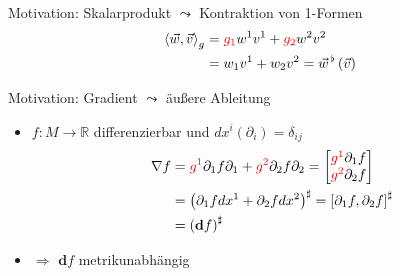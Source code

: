 \documentclass{beamer}
\newcommand{\R}{\mathds{R}}
\newcommand{\exd}{\mathbf{d}}
\newcommand{\vecflat}[1]{\vec{#1}^{\,\flat}}
\newcommand{\tred}[1]{\textcolor{red}{#1}}
\begin{document}
  \begin{frame}
    \begin{block}{Motivation: Skalarprodukt \( \leadsto \) Kontraktion von 1-Formen}
      \begin{align*}
        \left\langle \vec{w} , \vec{v} \right\rangle_{g} &= \tred{g_{1}}w^{1}v^{1} + \tred{g_{2}}w^{2}v^{2} \\
                                                     &= w_{1}v^{1} + w_{2}v^{2} 
                                                     = \vecflat{w}\left( \vec{v} \right)
      \end{align*}
    \end{block}

    \begin{block}{Motivation: Gradient \( \leadsto \) äußere Ableitung}
    \begin{itemize}
        \item \( f:M \rightarrow \R \) differenzierbar und \( dx^{i}(\partial_{i}) = \delta_{ij}  \)
      \begin{align*}
        \nabla f &= \tred{g^{1}}\partial_{1}f\partial_{1} + \tred{g^{2}}\partial_{2}f\partial_{2} =\begin{bmatrix}
                                                                                         \tred{g^{1}}\partial_{1}f \\
                                                                                         \tred{g^{2}}\partial_{2}f
                                                                                      \end{bmatrix} \\
                 &= \left( \partial_{1}f dx^{1} + \partial_{2}f dx^{2} \right)^{\sharp} = \left[ \partial_{1}f, \partial_{2}f \right]^{\sharp} \\
                 &= \left( \exd f \right)^{\sharp}
      \end{align*}
        \item \( \Rightarrow \) \( \exd f \) metrikunabhängig
      \end{itemize}
    \end{block}
  \end{frame}
\end{document}
